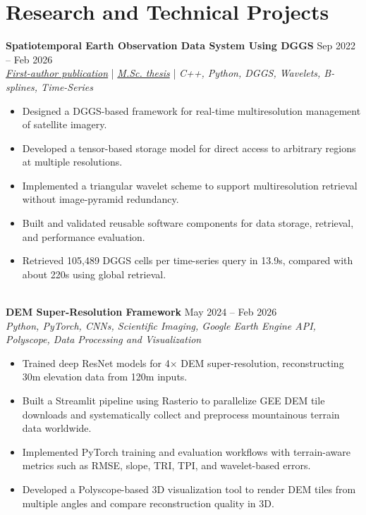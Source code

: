 \documentclass[a4paper,10pt]{article}
\begin{document}

\section*{Research and Technical Projects}

\noindent
\textbf{Spatiotemporal Earth Observation Data System Using DGGS} \hfill Sep 2022 -- Feb 2026 \\
\textit{\href{https://doi.org/10.3390/rs17040570}{First-author publication}} | \textit{\href{https://ucalgary.scholaris.ca/items/114b394b-e516-4732-bd3a-45dd6160d480}{M.Sc. thesis}} | \textit{C++, Python, DGGS, Wavelets, B-splines, Time-Series}
\begin{itemize}[leftmargin=0.25in]
    \item Designed a DGGS-based framework for real-time multiresolution management of satellite imagery.
    \item Developed a tensor-based storage model for direct access to arbitrary regions at multiple resolutions.
    \item Implemented a triangular wavelet scheme to support multiresolution retrieval without image-pyramid redundancy.
    \item Built and validated reusable software components for data storage, retrieval, and performance evaluation.
    \item Retrieved 105,489 DGGS cells per time-series query in 13.9s, compared with about 220s using global retrieval.
\end{itemize}

\noindent \\
\textbf{DEM Super-Resolution Framework} \hfill May 2024 -- Feb 2026 \\
\textit{Python, PyTorch, CNNs, Scientific Imaging, Google Earth Engine API, Polyscope, Data Processing and Visualization}
\begin{itemize}[leftmargin=0.25in]
    \item Trained deep ResNet models for 4$\times$ DEM super-resolution, reconstructing 30m elevation data from 120m inputs.
    \item Built a Streamlit pipeline using Rasterio to parallelize GEE DEM tile downloads and systematically collect and preprocess mountainous terrain data worldwide.
    \item Implemented PyTorch training and evaluation workflows with terrain-aware metrics such as RMSE, slope, TRI, TPI, and wavelet-based errors.
    \item Developed a Polyscope-based 3D visualization tool to render DEM tiles from multiple angles and compare reconstruction quality in 3D.
\end{itemize}
\end{document}
